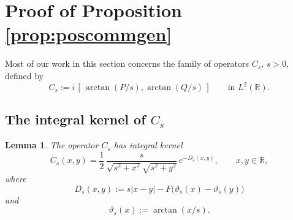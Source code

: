 \documentclass[11pt]{article}
\newtheorem{lemma}[theorem]{Lemma}
\theoremstyle{definition}
\theoremstyle{remark}
\newcommand{\R}{\mathbb{R}}
\newcommand{\abs}[1]{\left\lvert #1\right\rvert}
\begin{document}

\section{Proof of Proposition \ref{prop:poscommgen}}\label{sec:poscommgen}

Most of our work in this section concerns the family of operators
$C_s$, $s>0$, defined by
\[
C_s:=i\,[\,\arctan(P/s),\arctan(Q/s)\,]
\qquad\text{in }L^2(\R).
\]


\subsection*{The integral kernel of $C_s$}

\begin{lemma}\label{lem:intkernel}
The operator $C_s$ has integral kernel
\[
C_s(x,y)=\frac12\,
\frac{s}{\sqrt{s^2+x^2}\sqrt{s^2+y^2}}\,e^{-D_s(x,y)},
\qquad x,y\in\R,
\]
where
\begin{equation}\label{eq:Ds-def}
D_s(x,y):=s\abs{x-y}
-F\bigl(\vartheta_s(x)-\vartheta_s(y)\bigr)
\end{equation}
and
\begin{equation}\label{eq:theta-s}
\vartheta_s(x):=\arctan(x/s).
\end{equation}
\end{lemma}
\end{document}
